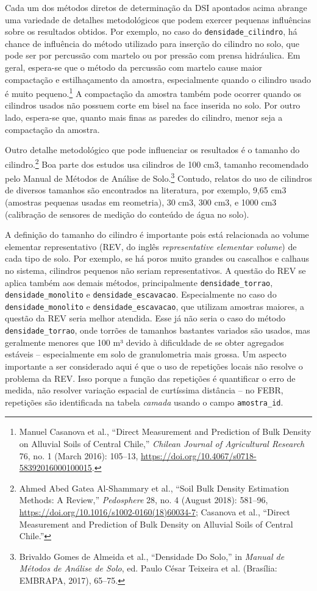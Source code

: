 \documentclass[
  a4paper,
  dvipsnames]{tufte-book}
\begin{document}
Cada um dos métodos diretos de determinação da DSI apontados acima abrange uma variedade de detalhes metodológicos que podem exercer pequenas influências sobre os resultados obtidos. Por exemplo, no caso do \texttt{densidade\_cilindro}, há chance de influência do método utilizado para inserção do cilindro no solo, que pode ser por percussão com martelo ou por pressão com prensa hidráulica. Em geral, espera-se que o método da percussão com martelo cause maior compactação e estilhaçamento da amostra, especialmente quando o cilindro usado é muito pequeno.\footnote{Manuel Casanova et al., ``Direct Measurement and Prediction of Bulk Density on Alluvial Soils of Central Chile,'' \emph{Chilean Journal of Agricultural Research} 76, no. 1 (March 2016): 105--13, \url{https://doi.org/10.4067/s0718-58392016000100015}.} A compactação da amostra também pode ocorrer quando os cilindros usados não possuem corte em bisel na face inserida no solo. Por outro lado, espera-se que, quanto mais finas as paredes do cilindro, menor seja a compactação da amostra.

Outro detalhe metodológico que pode influenciar os resultados é o tamanho do cilindro.\footnote{Ahmed Abed Gatea Al-Shammary et al., ``Soil Bulk Density Estimation Methods: A Review,'' \emph{Pedosphere} 28, no. 4 (August 2018): 581--96, \url{https://doi.org/10.1016/s1002-0160(18)60034-7}; Casanova et al., ``Direct Measurement and Prediction of Bulk Density on Alluvial Soils of Central Chile.''} Boa parte dos estudos usa cilindros de 100 cm3, tamanho recomendado pelo Manual de Métodos de Análise de Solo.\footnote{Brivaldo Gomes de Almeida et al., ``Densidade Do Solo,'' in \emph{Manual de Métodos de Análise de Solo}, ed. Paulo César Teixeira et al. (Brasília: EMBRAPA, 2017), 65--75.} Contudo, relatos do uso de cilindros de diversos tamanhos são encontrados na literatura, por exemplo, 9,65 cm3 (amostras pequenas usadas em reometria), 30 cm3, 300 cm3, e 1000 cm3 (calibração de sensores de medição do conteúdo de água no solo).

A definição do tamanho do cilindro é importante pois está relacionada ao volume elementar representativo (REV, do inglês \emph{representative elementar volume}) de cada tipo de solo. Por exemplo, se há poros muito grandes ou cascalhos e calhaus no sistema, cilindros pequenos não seriam representativos. A questão do REV se aplica também aos demais métodos, principalmente \texttt{densidade\_torrao}, \texttt{densidade\_monolito} e \texttt{densidade\_escavacao}. Especialmente no caso do \texttt{densidade\_monolito} e \texttt{densidade\_escavacao}, que utilizam amostras maiores, a questão da REV seria melhor atendida. Esse já não seria o caso do método \texttt{densidade\_torrao}, onde torrões de tamanhos bastantes variados são usados, mas geralmente menores que 100 m³ devido à dificuldade de se obter agregados estáveis -- especialmente em solo de granulometria mais grossa. Um aspecto importante a ser considerado aqui é que o uso de repetições locais não resolve o problema da REV. Isso porque a função das repetições é quantificar o erro de medida, não resolver variação espacial de curtíssima distância -- no FEBR, repetições são identificada na tabela \emph{camada} usando o campo \texttt{amostra\_id}.
\end{document}
